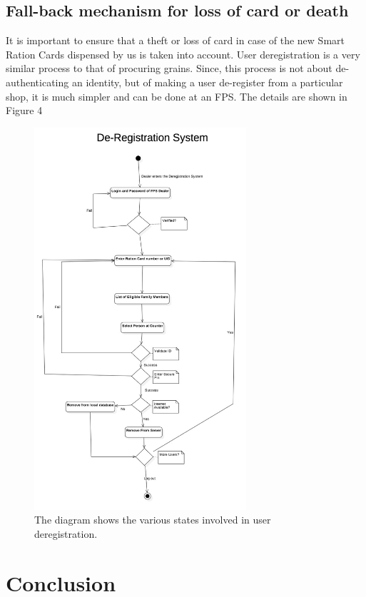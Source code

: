\documentclass[a4paper,12pt]{extarticle}
\begin{document}
\subsection{Fall-back mechanism for loss of card or death}
It is important to ensure that a theft or loss of card in case of the new Smart Ration Cards dispensed by us is taken into account. 
User deregistration is a very similar process to that of procuring grains. Since, this process is not about de-authenticating an identity, but of making a user de-register from a particular shop, it is much simpler and can be done at an FPS. The details are shown in Figure 4

\begin{figure}
\centering
\includegraphics[width=0.7\textwidth]{dereg.jpg}
\caption{\label{fig:dereg}The diagram shows the various states  involved in user deregistration.}
\end{figure}

\section{Conclusion}
\end{document}
